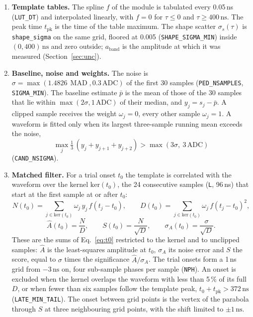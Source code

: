 \documentclass[11pt]{article}
\newcommand{\ns}{\,\mathrm{ns}}
\newcommand{\adc}{\,\mathrm{ADC}}
\newcommand{\code}[1]{\texttt{#1}}
\DeclareMathOperator{\MAD}{MAD}
\begin{document}
\begin{enumerate}
\item \textbf{Template tables.} The spline $f$ of the module is tabulated every 0.05\,ns (\code{LUT\_DT}) and interpolated linearly, with $f = 0$ for $\tau \le 0$ and $\tau \ge 400\ns$. The peak time $t_{\mathrm{pk}}$ is the time of the table maximum. The shape scatter $\sigma_s(\tau)$ is \code{shape\_sigma} on the same grid, floored at 0.005 (\code{SHAPE\_SIGMA\_MIN}) inside $(0, 400)\ns$ and zero outside; $a_{\mathrm{band}}$ is the amplitude at which it was measured (Section~\ref{sec:unc}).
\item \textbf{Baseline, noise and weights.} The noise is $\sigma = \max(1.4826\,\MAD, 0.3\adc)$ of the first 30 samples (\code{PED\_NSAMPLES}, \code{SIGMA\_MIN}). The baseline estimate $\bar p$ is the mean of those of the 30 samples that lie within $\max(2\sigma, 1\adc)$ of their median, and $y_j = s_j - \bar p$. A clipped sample receives the weight $\omega_j = 0$, every other sample $\omega_j = 1$. A waveform is fitted only when its largest three-sample running mean exceeds the noise,
\begin{equation}
\max_j \tfrac{1}{3}\,(y_j + y_{j+1} + y_{j+2}) > \max(3\sigma,\ 3\adc)
\end{equation}
(\code{CAND\_NSIGMA}).
\item \textbf{Matched filter.} For a trial onset $t_0$ the template is correlated with the waveform over the kernel $\mathrm{ker}(t_0)$, the 24 consecutive samples (\code{L}, 96\,ns) that start at the first sample at or after $t_0$:
\begin{equation}
N(t_0) = \sum_{j \in \mathrm{ker}(t_0)} \omega_j\, y_j\, f(t_j - t_0),
\qquad
D(t_0) = \sum_{j \in \mathrm{ker}(t_0)} \omega_j\, f(t_j - t_0)^2 ,
\label{eq:mf}
\end{equation}
\begin{equation}
\hat A(t_0) = \frac{N}{D}, \qquad S(t_0) = \frac{N}{\sqrt{D}}, \qquad \sigma_A(t_0) = \frac{\sigma}{\sqrt{D}} .
\end{equation}
These are the sums of Eq.~\eqref{eq:t0} restricted to the kernel and to unclipped samples: $\hat A$ is the least-squares amplitude at $t_0$, $\sigma_A$ its noise error and $S$ the score, equal to $\sigma$ times the significance $\hat A/\sigma_A$. The trial onsets form a 1\,ns grid from $-3\ns$ on, four sub-sample phases per sample (\code{NPH}). An onset is excluded when the kernel overlaps the waveform with less than 5\,\% of its full $D$, or when fewer than six samples follow the template peak, $t_0 + t_{\mathrm{pk}} > 372\ns$ (\code{LATE\_MIN\_TAIL}). The onset between grid points is the vertex of the parabola through $S$ at three neighbouring grid points, with the shift limited to $\pm 1\ns$.

\end{enumerate}
\end{document}
